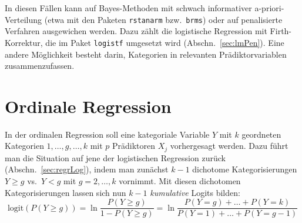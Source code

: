 In diesen Fällen kann auf Bayes-Methoden mit schwach informativer a-priori-Verteilung (etwa mit den Paketen \lstinline!rstanarm! bzw.\ \lstinline!brms!) oder auf penalisierte Verfahren ausgewichen werden. Dazu zählt die logistische Regression mit Firth-Korrektur, die im Paket  \lstinline!logistf! \cite{Heinze2013a} umgesetzt wird (Abschn.\ \ref{sec:lmPen}). Eine andere Möglichkeit besteht darin, Kategorien in relevanten Prädiktorvariablen zusammenzufassen.

\section{Ordinale Regression}
\label{sec:regrOrd}

In der ordinalen Regression soll eine kategoriale Variable $Y$ mit $k$ geordneten Kategorien $1, \dots, g, \dots, k$ mit $p$ Prädiktoren $X_{j}$ vorhergesagt werden. Dazu führt man die Situation auf jene der logistischen Regression zurück (Abschn.\ \ref{sec:regrLog}), indem man zunächst $k-1$ dichotome Kategorisierungen $Y \geq g$ vs.\ $Y < g$ mit $g = 2, \ldots, k$ vornimmt. Mit diesen dichotomen Kategorisierungen lassen sich nun $k-1$ \emph{kumulative} Logits bilden:
\begin{equation*}
\text{logit}(P(Y \geq g)) = \ln \frac{P(Y \geq g)}{1 - P(Y \geq g)} = \ln \frac{P(Y=g) + \dots + P(Y=k)}{P(Y=1) + \dots + P(Y=g-1)}
\end{equation*}

